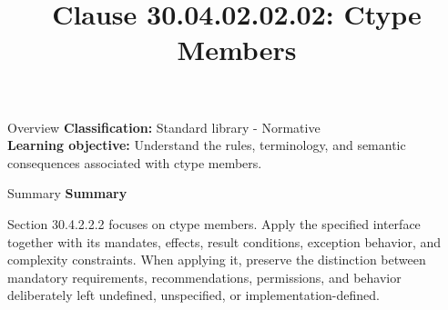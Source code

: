 \documentclass[10pt,letterpaper]{article}
\title{Clause 30.04.02.02.02: Ctype Members}
\author{}
\date{}
\begin{document}
\maketitle
\begin{CornellOverviewBox}{Overview}
\textbf{Classification:} Standard library - Normative\\[2pt]
\textbf{Learning objective:} Understand the rules, terminology, and semantic consequences associated with ctype members.
\end{CornellOverviewBox}\begin{CornellSummaryBox}{Summary}
{\sffamily\bfseries\color{Accent} Summary}\par\vspace{3pt}Section 30.4.2.2.2 focuses on ctype members. Apply the specified interface together with its mandates, effects, result conditions, exception behavior, and complexity constraints. When applying it, preserve the distinction between mandatory requirements, recommendations, permissions, and behavior deliberately left undefined, unspecified, or implementation-defined.
\end{CornellSummaryBox}
\end{document}

